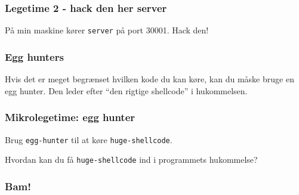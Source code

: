 \documentclass[slidestop,compress,mathserif, xcolor=table]{beamer}
\begin{document}
\begin{frame}[c]
    \frametitle{Legetime 2 - hack den her server}

    På min maskine kører \texttt{server} på port 30001. Hack den!

\end{frame}

\begin{frame}[c]
    \frametitle{Egg hunters}

    Hvis det er meget begrænset hvilken kode du kan køre, kan du måske bruge en
    egg hunter. Den leder efter ``den rigtige shellcode'' i hukommelsen.

    \vskip15pt

    \pause
    
\end{frame}

\begin{frame}[c]
  \frametitle{Mikrolegetime: egg hunter}

  Brug \texttt{egg-hunter} til at køre \texttt{huge-shellcode}.

  \vskip15pt

  Hvordan kan du få \texttt{huge-shellcode} ind i programmets hukommelse?
\end{frame}

\begin{frame}[c]
  \frametitle{Bam!}
  
\end{frame}
\end{document}
